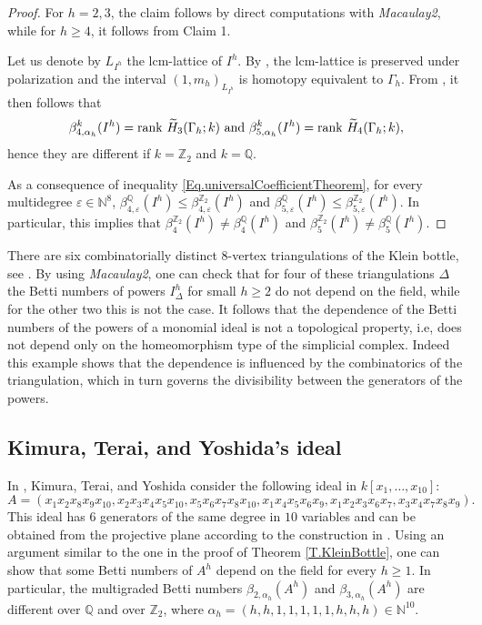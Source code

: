 \documentclass[11pt,oneside]{amsart}
\theoremstyle{plain}
\theoremstyle{definition}
\newcommand{\rk}{{\rm rank}\ }
\newcommand{\Q}{\mathbb{Q}}
\newcommand{\Z}{\mathbb{Z}}
\newcommand{\N}{\mathbb{N}}
\begin{document}
\begin{proof}
For $h=2,3$, the claim follows by direct computations with \textit{Macaulay2}, while for $h \geq 4$, it follows from Claim 1.

Let us denote by $L_{I^h}$ the lcm-lattice of $I^h$. By \cite[Proposition 2.3]{GPW99}, the lcm-lattice is preserved under polarization and the interval $(1, m_h)_{L_{I^h}}$ is homotopy equivalent to $\Gamma_h$. From \cite[Theorem 2.1]{GPW99}, it then follows that
\[
\beta_{4,\alpha_h}^k(I^h)=\rk \widetilde H_3 (\Gamma_h;k) \text{ and } \beta_{5,\alpha_h}^k(I^h)=\rk \widetilde H_4 (\Gamma_h;k),
\]
hence they are different if $k = \Z_2$ and $k = \Q$.

As a consequence of inequality \eqref{Eq.universalCoefficientTheorem}, 
for every multidegree $\varepsilon \in \mathbb N^8$, $\beta_{4,\varepsilon}^{\Q}(I^h) \leq \beta_{4,\varepsilon}^{\Z_2}(I^h)$ and $\beta_{5,\varepsilon}^{\Q}(I^h) \leq \beta_{5,\varepsilon}^{\Z_2}(I^h)$. In particular, this implies that $\beta_4^{\Z_2}(I^h) \neq \beta_4^{\Q}(I^h)$ and $\beta_5^{\Z_2}(I^h) \neq \beta_5^{\Q}(I^h)$.
\end{proof}


There are six combinatorially distinct $8$-vertex triangulations of the Klein bottle, see \cite[Figure 18]{C94}. By using \textit{Macaulay2}, one can check that for four of these triangulations $\Delta$ the Betti numbers of powers $I_{\Delta}^h$ for small $h \geq 2$ do not depend on the field, while for the other two this is not the case. It follows that the dependence of the Betti numbers of the powers of a monomial ideal is not a topological property, i.e, does not depend only on the homeomorphism type of the simplicial complex. Indeed this example shows that the dependence is influenced by the combinatorics of the triangulation, which in turn governs the divisibility between the generators of the powers.


\subsection{Kimura, Terai, and Yoshida's ideal}\label{S.KimuraTeraiYoshida}

In \cite[Section 6]{KTY09}, Kimura, Terai, and Yoshida consider the following ideal in $k[x_1,\dots,x_{10}]$:
\begin{equation*}%
A = (x_1x_2x_8x_9x_{10}, x_2x_3x_4x_5x_{10}, x_5x_6x_7x_8x_{10}, x_1x_4x_5x_6x_9, x_1x_2x_3x_6x_7, x_3x_4x_7x_8x_9).
\end{equation*}
This ideal has $6$ generators of the same degree in $10$ variables and can be obtained from the projective plane according to the construction in \cite[page 76]{KTY09}. Using an argument similar to the one in the proof of Theorem \ref{T.KleinBottle}, one can show that some Betti numbers of $A^h$ depend on the field for every $h \geq 1$. In particular, the multigraded Betti numbers $\beta_{2,\alpha_h}(A^h)$ and $\beta_{3,\alpha_h}(A^h)$ are different over $\Q$ and over $\Z_2$, where $\alpha_h = (h, h, 1, 1, 1, 1, 1, h, h, h) \in \N^{10}$. 
\end{document}
